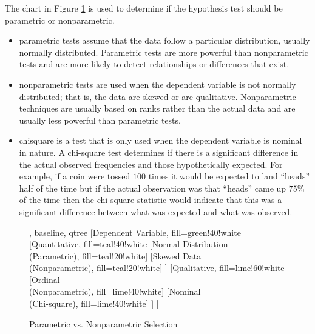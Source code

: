 The chart in Figure \ref{fig06.10} is used to determine if the hypothesis test should be parametric or nonparametric.

\begin{itemize}
	\item \Gls{parametric} tests assume that the data follow a particular distribution, usually normally distributed. Parametric tests are more powerful than nonparametric tests and are more likely to detect relationships or differences that exist.
	\item \Gls{nonparametric} tests are used when the dependent variable is not normally distributed; that is, the data are skewed or are qualitative. Nonparametric techniques are usually based on ranks rather than the actual data and are usually less powerful than parametric tests.
	\item \Gls{chisquare} is a test that is only used when the dependent variable is nominal in nature. A chi-square test determines if there is a significant difference in the actual observed frequencies and those hypothetically expected. For example, if a coin were tossed $ 100 $ times it would be expected to land ``heads'' half of the time but if the actual observation was that ``heads'' came up $ 75\% $ of the time then the chi-square statistic would indicate that this was a significant difference between what was expected and what was observed.
\end{itemize}

\begin{figure}[H]
	\centering
	
	
	\begin{forest}, baseline, qtree
		[Dependent Variable, fill=green!40!white
		[{Quantitative}, fill=teal!40!white
		[{Normal Distribution\\(Parametric)}, fill=teal!20!white]
		[{Skewed Data\\(Nonparametric)}, fill=teal!20!white]
		]
		[{Qualitative}, fill=lime!60!white
		[{Ordinal\\(Nonparametric)}, fill=lime!40!white]
		[{Nominal\\(Chi-square)}, fill=lime!40!white]
		]
		]
	\end{forest}
	
	\caption{Parametric vs. Nonparametric Selection}
	\label{fig06.10}
\end{figure}

